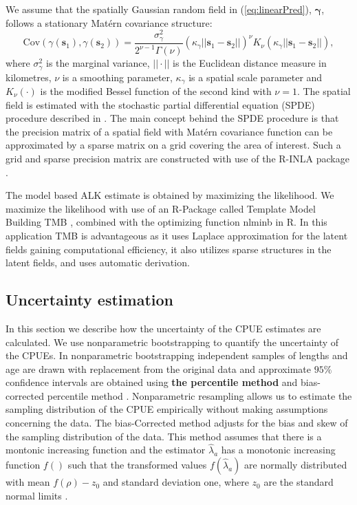 \documentclass[a4paper 12pt]{article}
\numberwithin{equation}{section}
\begin{document}
\indent We assume that the spatially Gaussian random field in (\ref{eq:linearPred}), $\pmb{\gamma}$, follows a stationary Mat\'{e}rn covariance structure:
\begin{equation}\label{eq:matern}
 \text{Cov}(\gamma(\mathbf{s}_1),\gamma(\mathbf{s}_2)) = \frac{\sigma^2_{\gamma}}{2^{\nu-1}\Gamma(\nu)}(\kappa_{\gamma}||\mathbf{s}_1 -\mathbf{s}_2||)^{\nu}K_{\nu}(\kappa_{\gamma}||\mathbf{s}_1-\mathbf{s}_2||),
\end{equation}
where $\sigma^2_{\gamma}$ is the marginal variance, $||\cdot||$ is the Euclidean distance measure in kilometres, $\nu$ is a smoothing parameter, $\kappa_{\gamma}$ is a spatial scale parameter and $K_{\nu}(\cdot)$ is the modified Bessel function of the second kind with $\nu = 1$. The spatial field is estimated with the stochastic partial differential equation (SPDE) procedure described in \citet{lindgren2011explicit}. The main concept behind the SPDE procedure is that the precision matrix of a spatial field with Mat\'{e}rn  covariance function can be approximated by a sparse matrix on a grid covering the area of interest. Such a grid and sparse precision matrix are constructed with use of the R-INLA package \citep{rue2009approximate}.

The model based ALK estimate is obtained by maximizing the likelihood. We maximize the likelihood with use of an R-Package called Template Model Building {\sffamily TMB} \citep{kristensen2015tmb}, combined with the optimizing function {\sffamily nlminb} in R. In this application {\sffamily TMB} is advantageous as it uses Laplace approximation for the latent fields gaining computational efficiency, it also utilizes sparse structures in the latent fields, and uses automatic derivation. 


\subsection{Uncertainty estimation}
\label{sec:uncertaintyestimation}
In this section we describe how the uncertainty of the CPUE estimates are calculated. We use nonparametric bootstrapping to quantify the uncertainty of the CPUEs. In nonparametric bootstrapping independent samples of lengths and age are drawn with replacement from the original data and approximate $95\%$ confidence intervals are obtained using {\bf the percentile method}  and bias-corrected percentile method  \citep{carpenter2000bootstrap}. Nonparametric resampling allows us to estimate the sampling distribution of the CPUE empirically without making assumptions concerning the data. The bias-Corrected method adjusts for the bias and skew of the sampling distribution of the data. This method assumes that there is a montonic increasing function and the estimator $\hat{\lambda}_{a}$ has a monotonic increasing function $f()$ such that the transformed values $f(\hat{\lambda}_{a})$ are normally distributed with mean $f(\rho) - z_{0}$ and standard deviation one, where $z_{0}$ are the standard normal limits \citep{puth2015variety}.
\end{document}
